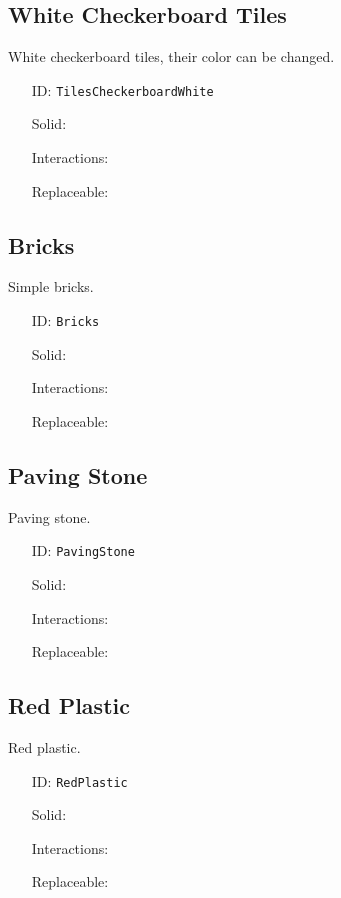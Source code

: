 \subsection{White Checkerboard Tiles}\label{subsec:blocks_white checkerboard tiles}
White checkerboard tiles, their color can be changed.
\newline
\begin{itemize}[nosep]
    \item[ID:] \texttt{TilesCheckerboardWhite}
    \item[Solid:]  \Checkmark \item[Interactions:]  \Checkmark \item[Replaceable:]  \XSolidBrush
\end{itemize}

\subsection{Bricks}\label{subsec:blocks_bricks}
Simple bricks.
\newline
\begin{itemize}[nosep]
    \item[ID:] \texttt{Bricks}
    \item[Solid:]  \Checkmark \item[Interactions:]  \XSolidBrush \item[Replaceable:]  \XSolidBrush
\end{itemize}

\subsection{Paving Stone}\label{subsec:blocks_paving stone}
Paving stone.
\newline
\begin{itemize}[nosep]
    \item[ID:] \texttt{PavingStone}
    \item[Solid:]  \Checkmark \item[Interactions:]  \XSolidBrush \item[Replaceable:]  \XSolidBrush
\end{itemize}

\subsection{Red Plastic}\label{subsec:blocks_red plastic}
Red plastic.
\newline
\begin{itemize}[nosep]
    \item[ID:] \texttt{RedPlastic}
    \item[Solid:]  \Checkmark \item[Interactions:]  \XSolidBrush \item[Replaceable:]  \XSolidBrush
\end{itemize}

